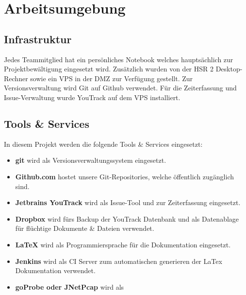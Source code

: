 \section{Arbeitsumgebung}
\label{sec:Arbeitsumgebung}

\subsection{Infrastruktur}
Jedes Teammitglied hat ein persönliches Notebook welches hauptsächlich zur Projektbewältigung eingesetzt wird. Zusätzlich wurden von der \acs{HSR} 2 Desktop-Rechner sowie ein \acs{VPS} in der DMZ zur Verfügung gestellt.
Zur Versionsverwaltung wird Git auf Github verwendet. Für die Zeiterfassung und Issue-Verwaltung wurde YouTrack auf dem \acs{VPS} installiert.

\subsection{Tools \& Services}
In diesem Projekt werden die folgende Tools \& Services eingesetzt:

\begin{itemize}
  \item \textbf{git} \newline wird als Versionsverwaltungssystem eingesetzt.
  \item \textbf{Github.com} \newline hostet unsere Git-Repositories, welche öffentlich zugänglich sind.
  \item \textbf{Jetbrains YouTrack} \newline wird als Issue-Tool und zur Zeiterfassung eingesetzt. 
  \item \textbf{Dropbox} \newline wird fürs Backup der YouTrack Datenbank und als Datenablage für flüchtige Dokumente \& Dateien verwendet.
  \item \textbf{\LaTeX} \newline wird als Programmiersprache für die Dokumentation eingesetzt.
  \item \textbf{Jenkins} \newline wird als \acl{CI} Server zum automatischen generieren der LaTex Dokumentation verwendet.
  \item \textbf{goProbe oder JNetPcap} \newline wird als 
\end{itemize}